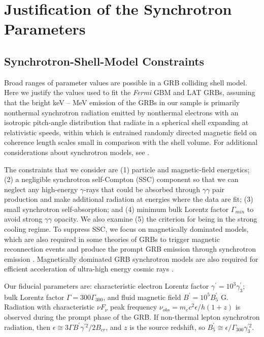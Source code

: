 \chapter{Justification of the Synchrotron Parameters}
\label{ch:pap2app}
\section{Synchrotron-Shell-Model Constraints}
Broad ranges of parameter values are possible in a GRB colliding shell
model. Here we justify the values used to fit the {\it Fermi} GBM and
LAT GRBs, assuming that the bright keV -- MeV emission of the GRBs in
our sample is primarily nonthermal synchrotron radiation emitted by
nonthermal electrons with an isotropic pitch-angle distribution that
radiate in a spherical shell expanding at relativistic speeds, within
which is entrained randomly directed magnetic field on coherence
length scales small in comparison with the shell volume. For
additional considerations about synchrotron models, see
\cite{2013ApJ...769...69B}.


The constraints that we consider are (1) particle and magnetic-field
energetics; (2) a negligible synchrotron self-Compton (SSC) component
so that we can neglect any high-energy $\gamma$-rays that could be
absorbed through $\gamma\gamma$ pair production and make additional
radiation at energies where the data are fit; (3) small synchrotron
self-absorption; and (4) minimum bulk Lorentz factor $\Gamma_{min}$ to
avoid strong $\gamma\gamma$ opacity. We also examine (5) the criterion
for being in the strong cooling regime.  To suppress SSC, we focus on
magnetically dominated models, which are also required in some
theories of GRBs to trigger magnetic reconnection events and produce
the prompt GRB emission through synchrotron emission
\cite{2009JPhCS.189a2018G,zhang:2011}. Magnetically
dominated GRB synchrotron models are also required for efficient
acceleration of ultra-high energy cosmic rays
\cite{2010OAJ.....3..150R}.


Our fiducial parameters are: characteristic electron Lorentz factor
$\gamma^\prime = 10^3 \gamma^\prime_3$; bulk Lorentz factor $\Gamma =
300\Gamma_{300}$, and fluid magnetic field $B^\prime = 10^5
B^\prime_5$ G. Radiation with characteristic $\nu F_\nu$ peak
frequency $\nu_{obs} = m_ec^2 \epsilon /h(1+z)$ is observed during the
prompt phase of the GRB. If non-thermal lepton synchrotron radiation,
then $\epsilon \cong 3\Gamma B^\prime \gamma^{\prime 2}/2B_{cr}$, and
$z$ is the source redshift, so $B_5^\prime \cong \epsilon/\Gamma_{300}
\gamma_3^{\prime 2}$.



